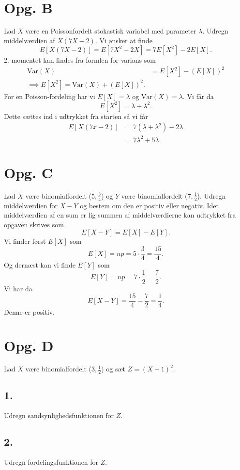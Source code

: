 \documentclass[12pt]{article}
\theoremstyle{definition}
\begin{document}
\section*{Opg. B}
Lad $X$ være en Poissonfordelt stokastisk variabel med parameter $\lambda$. Udregn middelværdien af $X(7X-2)$.
\bigbreak
Vi ønsker at finde
\[ 
  E[X(7X - 2)] = E[7X^2 - 2X] = 7E[X^2] - 2E[X]
.\]
2.-momentet kan findes fra formlen for varians som
\begin{align*}
  \mathrm{Var}(X) &= E[X^2] - (E[X])^2 \\
  \implies E[X^2] = \mathrm{Var}(X)+ (E[X])^2
.\end{align*}
For en Poisson-fordeling har vi $E[X] = \lambda$ og $\mathrm{Var}(X) = \lambda$. Vi får da
\[ 
  E[X^2] = \lambda + \lambda^2
.\]
Dette sættes ind i udtrykket fra starten så vi får
\begin{align*}
  E[X(7x-2)] &= 7 \left( \lambda + \lambda^2 \right) - 2\lambda \\
             &= 7\lambda^2 + 5\lambda
.\end{align*}


\section*{Opg. C}
Lad $X$ være binomialfordelt ($5, \frac{3}{4}$) og $Y$ være binomialfordelt ($7, \frac{1}{2}$). Udregn middelværdien for $X-Y$ og bestem om den er positiv eller negativ.
\bigbreak
Idet middelværdien af en sum er lig summen af middelværdierne kan udtrykket fra opgaven skrives som
\[ 
  E[X-Y] = E[X] - E[Y]
.\]
Vi finder først $E[X]$ som
\[ 
  E[X] = np = 5\cdot \frac{3}{4} = \frac{15}{4}
.\]
Og dernæst kan vi finde $E[Y]$ som
\[ 
  E[Y] = np = 7\cdot \frac{1}{2} = \frac{7}{2}
.\]
Vi har da
\[ 
  E[X-Y] = \frac{15}{4} - \frac{7}{2} = \frac{1}{4}
.\]
Denne er positiv.


\section*{Opg. D}
Lad $X$ være binomialfordelt ($3, \frac{1}{2}$) og sæt $Z = (X - 1)^2$.

\subsection*{1.}
Udregn sandsynlighedsfunktionen for $Z$.

\subsection*{2.}
Udregn fordelingsfunktionen for $Z$.
\end{document}
